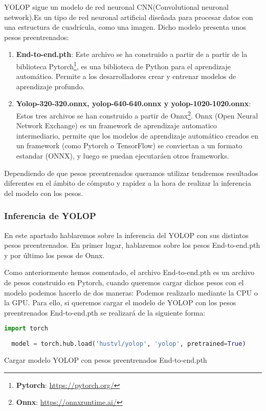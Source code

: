 YOLOP sigue un modelo de red neuronal CNN(Convolutional neuronal network).Es un tipo de red neuronal artificial diseñada para procesar datos con una
estructura de cuadrícula, como una imagen. Dicho modelo presenta unos pesos preentrenados: 

\begin{enumerate}
  \item \textbf{End-to-end.pth}: Este archivo se ha construido a partir de a partir de la biblioteca Pytorch\footnote{\textbf{Pytorch}: \url{https://pytorch.org/}}, es una biblioteca de Python para el aprendizaje
  automático. Permite a los desarrolladores crear y entrenar modelos de aprendizaje profundo. 
  \item \textbf{Yolop-320-320.onnx, yolop-640-640.onnx y yolop-1020-1020.onnx}: Estos tres archivos se han construido a partir de Onnx\footnote{\textbf{Onnx}: \url{https://onnxruntime.ai/}}. 
  Onnx (Open Neural Network Exchange) es un framework de aprendizaje automatico intermediario, permite que los modelos de aprendizaje
  automático creados en un framework (como Pytorch o TensorFlow) se conviertan a un formato estandar (ONNX), y luego se puedan ejecutaráen otros frameworks. 
\end{enumerate}

Dependiendo de que pesos preentrenados queramos utilizar tendremos resultados diferentes en el ámbito de cómputo y rapidez a la hora de 
realizar la inferencia del modelo con los pesos. 

\subsubsection{Inferencia de YOLOP}
\label{sec:Inferencia de YOLOP}

En este apartado hablaremos sobre la inferencia del YOLOP con sus distintos pesos preentrenados. En primer lugar, hablaremos
sobre los pesos End-to-end.pth y por último los pesos de Onnx.

Como anteriormente hemos comentado, el archivo End-to-end.pth es un archivo de pesos construido en Pytorch, cuando queremos cargar
dichos pesos con el modelo podemos hacerlo de dos maneras: Podemos realizarlo mediante la CPU o la GPU. 
Para ello, si queremos cargar el modelo de YOLOP con los pesos preentrenados End-to-end.pth se realizará de la siguiente forma:
\begin{code}[h]
  \begin{lstlisting}[language=Python]
  import torch
  
  model = torch.hub.load('hustvl/yolop', 'yolop', pretrained=True)

  \end{lstlisting}
  \caption[Cargar modelo YOLOP con pesos preentrenados End-to-end.pth]{Cargar modelo YOLOP con pesos preentrenados End-to-end.pth}
  \label{cod:codejemplo}
  \end{code}  

